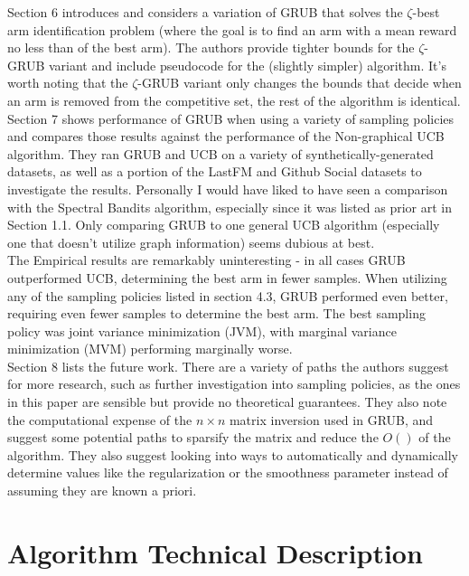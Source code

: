 \documentclass{article}[12pt]
\begin{document}
Section 6 introduces and considers a variation of GRUB that solves the $\zeta$-best arm identification problem (where the goal is to find an arm with a mean reward no less than of the best arm).
The authors provide tighter bounds for the $\zeta$-GRUB variant and include pseudocode for the (slightly simpler) algorithm.
It’s worth noting that the $\zeta$-GRUB variant only changes the bounds that decide when an arm is removed from the competitive set, the rest of the algorithm is identical. \\

Section 7 shows performance of GRUB when using a variety of sampling policies and compares those results against the performance of the Non-graphical UCB algorithm.
They ran GRUB and UCB on a variety of synthetically-generated datasets, as well as a portion of the LastFM and Github Social datasets to investigate the results.
Personally I would have liked to have seen a comparison with the Spectral Bandits algorithm, especially since it was listed as prior art in Section 1.1.
Only comparing GRUB to one general UCB algorithm (especially one that doesn’t utilize graph information) seems dubious at best. \\

The Empirical results are remarkably uninteresting - in all cases GRUB outperformed UCB, determining the best arm in fewer samples.
When utilizing any of the sampling policies listed in section 4.3, GRUB performed even better, requiring even fewer samples to determine the best arm.
The best sampling policy was joint variance minimization (JVM), with marginal variance minimization (MVM) performing marginally worse. \\

Section 8 lists the future work.
There are a variety of paths the authors suggest for more research,
such as further investigation into sampling policies,
as the ones in this paper are sensible but provide no theoretical guarantees.
They also note the computational expense of the $n \times n$ matrix inversion used in GRUB,
and suggest some potential paths to sparsify the matrix and reduce the $O()$ of the algorithm.
They also suggest looking into ways to automatically and dynamically determine values like the regularization or the smoothness parameter instead of assuming they are known a priori. \\

\pagebreak

\section{Algorithm Technical Description}
\end{document}

